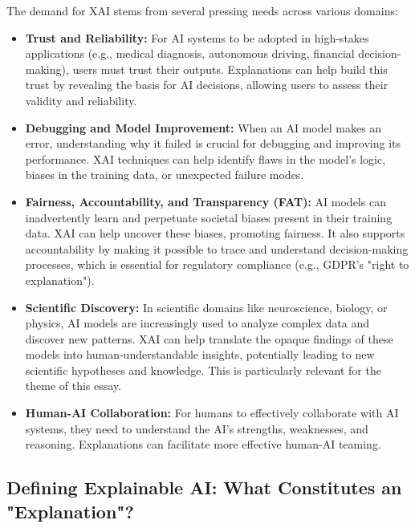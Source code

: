 \documentclass[11pt,a4paper]{article}
\begin{document}
The demand for XAI stems from several pressing needs across various domains:
\begin{itemize}
    \item \textbf{Trust and Reliability:} For AI systems to be adopted in high-stakes applications (e.g., medical diagnosis, autonomous driving, financial decision-making), users must trust their outputs. Explanations can help build this trust by revealing the basis for AI decisions, allowing users to assess their validity and reliability.
    \item \textbf{Debugging and Model Improvement:} When an AI model makes an error, understanding why it failed is crucial for debugging and improving its performance. XAI techniques can help identify flaws in the model's logic, biases in the training data, or unexpected failure modes.
    \item \textbf{Fairness, Accountability, and Transparency (FAT):} AI models can inadvertently learn and perpetuate societal biases present in their training data. XAI can help uncover these biases, promoting fairness. It also supports accountability by making it possible to trace and understand decision-making processes, which is essential for regulatory compliance (e.g., GDPR's "right to explanation").
    \item \textbf{Scientific Discovery:} In scientific domains like neuroscience, biology, or physics, AI models are increasingly used to analyze complex data and discover new patterns. XAI can help translate the opaque findings of these models into human-understandable insights, potentially leading to new scientific hypotheses and knowledge. This is particularly relevant for the theme of this essay.
    \item \textbf{Human-AI Collaboration:} For humans to effectively collaborate with AI systems, they need to understand the AI's strengths, weaknesses, and reasoning. Explanations can facilitate more effective human-AI teaming.
\end{itemize}

\subsection{Defining Explainable AI: What Constitutes an "Explanation"?}
\end{document}
